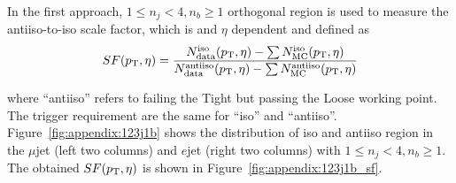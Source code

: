 In the first approach, $1\leq n_j<4,n_b\geq1$ orthogonal region is used to measure the antiiso-to-iso scale factor, which is \pt and $\eta$ dependent and defined as
\begin{equation}
SF (p_{\mathrm{T}}, \eta) =  \frac{N^{\rm{iso}}_{\rm{data}} (p_{\mathrm{T}}, \eta) - \sum N^{\rm{iso}}_{\rm{MC}}(p_{\mathrm{T}}, \eta) } 
{N^{\rm{antiiso}}_{\rm{data}} (p_{\mathrm{T}}, \eta)- \sum N^{\rm{antiiso}}_{\rm{MC}}(p_{\mathrm{T}}, \eta) }
\end{equation}

\noindent where ``antiiso'' refers to failing the Tight but passing the Loose working point. The trigger requirement are the same for ``iso'' and ``antiiso''. Figure~\ref{fig:appendix:123j1b} shows the distribution of iso and antiiso region in the $\mu$jet (left two columns) and $e$jet (right two columns) with $1\leq n_j<4,n_b\geq1$. The obtained $SF (p_{\mathrm{T}}, \eta)$ is shown in Figure~\ref{fig:appendix:123j1b_sf}.

